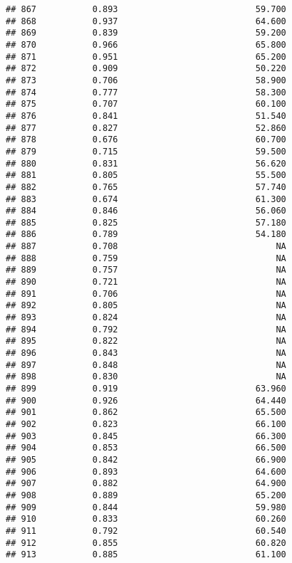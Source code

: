 \documentclass[
]{article}
\begin{document}
\begin{verbatim}
## 867           0.893                           59.700
## 868           0.937                           64.600
## 869           0.839                           59.200
## 870           0.966                           65.800
## 871           0.951                           65.200
## 872           0.909                           50.220
## 873           0.706                           58.900
## 874           0.777                           58.300
## 875           0.707                           60.100
## 876           0.841                           51.540
## 877           0.827                           52.860
## 878           0.676                           60.700
## 879           0.715                           59.500
## 880           0.831                           56.620
## 881           0.805                           55.500
## 882           0.765                           57.740
## 883           0.674                           61.300
## 884           0.846                           56.060
## 885           0.825                           57.180
## 886           0.789                           54.180
## 887           0.708                               NA
## 888           0.759                               NA
## 889           0.757                               NA
## 890           0.721                               NA
## 891           0.706                               NA
## 892           0.805                               NA
## 893           0.824                               NA
## 894           0.792                               NA
## 895           0.822                               NA
## 896           0.843                               NA
## 897           0.848                               NA
## 898           0.830                               NA
## 899           0.919                           63.960
## 900           0.926                           64.440
## 901           0.862                           65.500
## 902           0.823                           66.100
## 903           0.845                           66.300
## 904           0.853                           66.500
## 905           0.842                           66.900
## 906           0.893                           64.600
## 907           0.882                           64.900
## 908           0.889                           65.200
## 909           0.844                           59.980
## 910           0.833                           60.260
## 911           0.792                           60.540
## 912           0.855                           60.820
## 913           0.885                           61.100

\end{verbatim}
\end{document}
